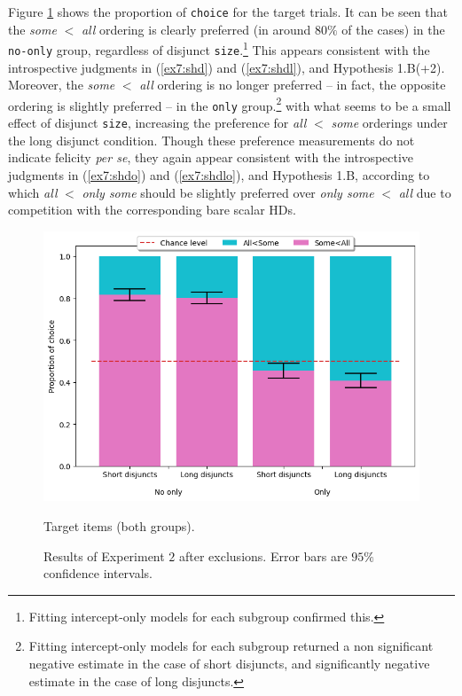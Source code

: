 Figure \ref{fig7:exp2-targets} shows the proportion of \texttt{choice} for the target trials. It can be seen that the \textit{some} $<$ \textit{all} ordering is clearly preferred (in around $80\%$ of the cases) in the \texttt{no-only} group, regardless of disjunct \texttt{size}.\footnote{Fitting intercept-only models for each subgroup confirmed this. } This appears consistent with the introspective judgments in (\ref{ex7:shd}) and (\ref{ex7:shdl}), and Hypothesis 1.B(+2). Moreover, the \textit{some} $<$ \textit{all} ordering is no longer preferred -- in fact, the opposite ordering is slightly preferred -- in the \texttt{only} group.\footnote{Fitting intercept-only models for each subgroup returned a non significant negative estimate in the case of short disjuncts, and significantly negative estimate in the case of long disjuncts.} with what seems to be a small effect of disjunct \texttt{size}, increasing the preference for \textit{all} $<$ \textit{some} orderings under the long disjunct condition. Though these preference measurements do not indicate felicity \textit{per se}, they again appear consistent with the introspective judgments in (\ref{ex7:shdo}) and (\ref{ex7:shdlo}), and Hypothesis 1.B, according to which \textit{all} $<$ \textit{only some} should be slightly preferred over \textit{only some} $<$ \textit{all} due to competition with the corresponding bare scalar HDs.



\begin{figure}[H]

		\centering
		\includegraphics[width=.6\linewidth]{./exp2-targets.png}
		\caption{Target items (both groups).}\label{fig7:exp2-targets}
	\caption{Results of Experiment $2$ after exclusions. Error bars are $95\%$ confidence intervals.}
\end{figure}

